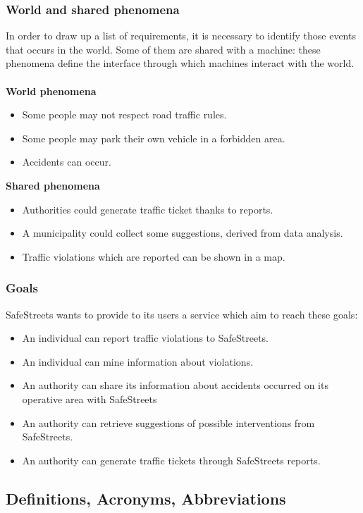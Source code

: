 \documentclass{article}
\newcommand\goal[1]{\item[{[G#1]}] }
\begin{document}
			\subsubsection{World and shared phenomena}
				In order to draw up a list of requirements, it is necessary to identify those events that occurs in the world. Some of them are shared with a machine: these phenomena define the interface through which machines interact with the world.\\\\				
				\textbf{World phenomena}
				\begin{itemize}
					\item Some people may not respect road traffic rules.
					\item Some people may park their own vehicle in a forbidden area.
					\item Accidents can occur.
				\end{itemize}
				\textbf{Shared phenomena}
				\begin{itemize}
					\item Authorities could generate traffic ticket thanks to reports. 
					\item A municipality could collect some suggestions, derived from data analysis.
					\item Traffic violations which are reported can be shown in a map.
				\end{itemize}
			\subsubsection{Goals}
				SafeStreets wants to provide to its users a service which aim to reach these goals:
				\begin{itemize}
					\goal{1}An individual can report traffic violations to SafeStreets.
					\goal{2}An individual can mine information about violations.					
					\goal{3}An authority can share its information about accidents occurred on its operative area with SafeStreets
					\goal{4}An authority can retrieve suggestions of possible interventions from SafeStreets.
					\goal{5}An authority can generate traffic tickets through SafeStreets reports.
				\end{itemize}
				
				
		\subsection{Definitions, Acronyms, Abbreviations}
\end{document}
